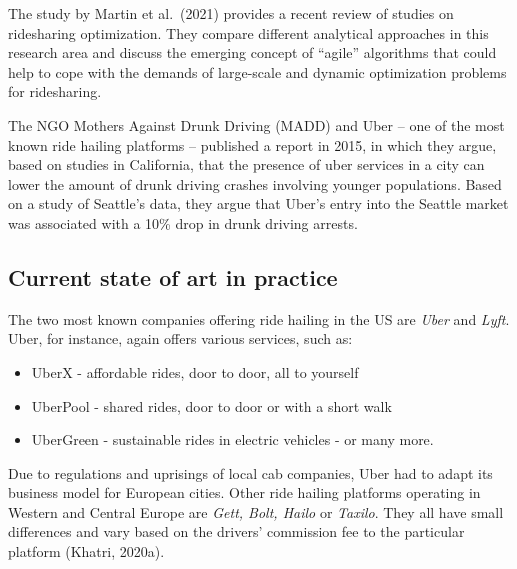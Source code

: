 \documentclass[
]{book}
\providecommand{\tightlist}{%
  \setlength{\itemsep}{0pt}\setlength{\parskip}{0pt}}
\begin{document}
The study by Martin et al.~(2021) provides a recent review of studies on ridesharing optimization. They compare different analytical approaches in this research area and discuss the emerging concept of ``agile'' algorithms that could help to cope with the demands of large-scale and dynamic optimization problems for ridesharing.

The NGO Mothers Against Drunk Driving (MADD) and Uber -- one of the most known ride hailing platforms -- published a report in 2015, in which they argue, based on studies in California, that the presence of uber services in a city can lower the amount of drunk driving crashes involving younger populations. Based on a study of Seattle's data, they argue that Uber's entry into the Seattle market was associated with a 10\% drop in drunk driving arrests.

\hypertarget{current-state-of-art-in-practice-33}{%
\subsection*{Current state of art in practice}\label{current-state-of-art-in-practice-33}}

The two most known companies offering ride hailing in the US are \emph{Uber} and \emph{Lyft}. Uber, for instance, again offers various services, such as:

\begin{itemize}
\tightlist
\item
  UberX - affordable rides, door to door, all to yourself
\item
  UberPool - shared rides, door to door or with a short walk
\item
  UberGreen - sustainable rides in electric vehicles - or many more.
\end{itemize}

Due to regulations and uprisings of local cab companies, Uber had to adapt its business model for European cities. Other ride hailing platforms operating in Western and Central Europe are \emph{Gett, Bolt, Hailo} or \emph{Taxilo}. They all have small differences and vary based on the drivers' commission fee to the particular platform (Khatri, 2020a).
\end{document}
